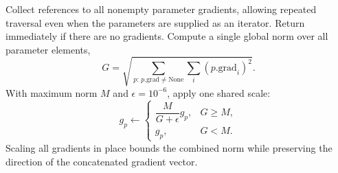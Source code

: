 

Collect references to all nonempty parameter
gradients, allowing repeated traversal even when the parameters are supplied
as an iterator. Return immediately if there are no gradients. Compute a single
global norm over all parameter elements,
\[
G=\sqrt{\sum_{p:\,p.\mathrm{grad}\ne\mathrm{None}}
                   \sum_i (p.\mathrm{grad}_i)^2}.
\]
With maximum norm $M$ and $\epsilon=10^{-6}$, apply one shared scale:
\[
g_p\leftarrow\begin{cases}
\dfrac{M}{G+\epsilon}g_p,&G\geq M,\\[4pt]
g_p,&G<M.
\end{cases}
\]
Scaling all gradients in place bounds the combined norm while preserving
the direction of the concatenated gradient vector.

